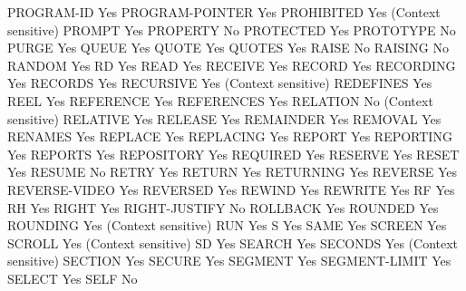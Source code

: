 PROGRAM-ID                      Yes
PROGRAM-POINTER                 Yes
PROHIBITED                      Yes (Context sensitive)
PROMPT                          Yes
PROPERTY                        No
PROTECTED                       Yes
PROTOTYPE                       No
PURGE                           Yes
QUEUE                           Yes
QUOTE                           Yes
QUOTES                          Yes
RAISE                           No
RAISING                         No
RANDOM                          Yes
RD                              Yes
READ                            Yes
RECEIVE                         Yes
RECORD                          Yes
RECORDING                       Yes
RECORDS                         Yes
RECURSIVE                       Yes (Context sensitive)
REDEFINES                       Yes
REEL                            Yes
REFERENCE                       Yes
REFERENCES                      Yes
RELATION                        No (Context sensitive)
RELATIVE                        Yes
RELEASE                         Yes
REMAINDER                       Yes
REMOVAL                         Yes
RENAMES                         Yes
REPLACE                         Yes
REPLACING                       Yes
REPORT                          Yes
REPORTING                       Yes
REPORTS                         Yes
REPOSITORY                      Yes
REQUIRED                        Yes
RESERVE                         Yes
RESET                           Yes
RESUME                          No
RETRY                           Yes
RETURN                          Yes
RETURNING                       Yes
REVERSE                         Yes
REVERSE-VIDEO                   Yes
REVERSED                        Yes
REWIND                          Yes
REWRITE                         Yes
RF                              Yes
RH                              Yes
RIGHT                           Yes
RIGHT-JUSTIFY                   No
ROLLBACK                        Yes
ROUNDED                         Yes
ROUNDING                        Yes (Context sensitive)
RUN                             Yes
S                               Yes
SAME                            Yes
SCREEN                          Yes
SCROLL                          Yes (Context sensitive)
SD                              Yes
SEARCH                          Yes
SECONDS                         Yes (Context sensitive)
SECTION                         Yes
SECURE                          Yes
SEGMENT                         Yes
SEGMENT-LIMIT                   Yes
SELECT                          Yes
SELF                            No
